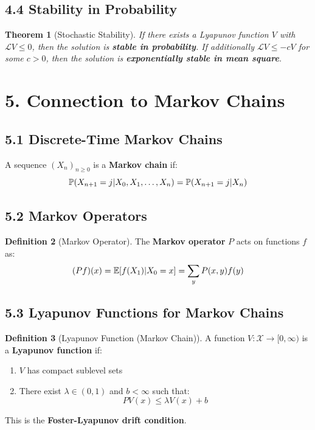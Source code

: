 \documentclass{amsart}
\let\originalmathbb\mathbb
\renewcommand{\mathbb}[1]{%
    \ifstrequal{#1}{1}{\mathbbm{#1}}{\originalmathbb{#1}}%
}
\theoremstyle{plain}
\newtheorem{theorem}{Theorem}[section]
\theoremstyle{definition}
\newtheorem{definition}[theorem]{Definition}
\theoremstyle{remark}
\begin{document}
\subsection{4.4 Stability in Probability}

\begin{theorem}[Stochastic Stability]
If there exists a Lyapunov function $V$ with $\mathcal{L}V \leq 0$, then the solution is \textbf{stable in probability}.
If additionally $\mathcal{L}V \leq -cV$ for some $c > 0$, then the solution is \textbf{exponentially stable in mean square}.
\end{theorem}
\section{5. Connection to Markov Chains}

\subsection{5.1 Discrete-Time Markov Chains}

A sequence $(X_n)_{n \geq 0}$ is a \textbf{Markov chain} if:
\[
\mathbb{P}(X_{n+1} = j | X_0, X_1, \ldots, X_n) = \mathbb{P}(X_{n+1} = j | X_n)
\]

\subsection{5.2 Markov Operators}

\begin{definition}[Markov Operator]
The \textbf{Markov operator} $P$ acts on functions $f$ as:
\[
(Pf)(x) = \mathbb{E}[f(X_1) | X_0 = x] = \sum_y P(x,y)f(y)
\]
\end{definition}
\subsection{5.3 Lyapunov Functions for Markov Chains}

\begin{definition}[Lyapunov Function (Markov Chain)]
A function $V: \mathcal{X} \to [0,\infty)$ is a \textbf{Lyapunov function} if:
	\begin{enumerate}
		\item $V$ has compact sublevel sets
		\item There exist $\lambda \in (0,1)$ and $b < \infty$ such that:
\[
PV(x) \leq \lambda V(x) + b
\]
	\end{enumerate}
\end{definition}
This is the \textbf{Foster-Lyapunov drift condition}.
\end{document}

